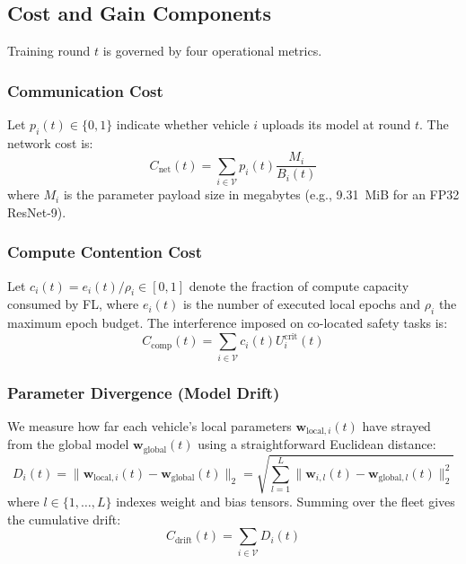 \documentclass[conference]{IEEEtran}
\begin{document}
\subsection{Cost and Gain Components}
Training round $t$ is governed by four operational metrics.

\subsubsection{Communication Cost}
Let $p_i(t) \in \{0,1\}$ indicate whether vehicle $i$ uploads its model at round $t$. The network cost is:
\begin{equation}
C_{\text{net}}(t) = \sum_{i \in \mathcal{V}} p_i(t) \frac{M_i}{B_i(t)}
\end{equation}
where $M_i$ is the parameter payload size in megabytes (e.g., 9.31~MiB for an FP32 ResNet-9).

\subsubsection{Compute Contention Cost}
Let $c_i(t) = e_i(t)/\rho_i \in [0,1]$ denote the fraction of compute capacity consumed by FL, where $e_i(t)$ is the number of executed local epochs and $\rho_i$ the maximum epoch budget. The interference imposed on co-located safety tasks is:
\begin{equation}
C_{\text{comp}}(t) = \sum_{i \in \mathcal{V}} c_i(t) U_i^{\text{crit}}(t)
\end{equation}

\subsubsection{Parameter Divergence (Model Drift)}
We measure how far each vehicle's local parameters $\mathbf{w}_{\text{local},i}(t)$ have strayed from the global model $\mathbf{w}_{\text{global}}(t)$ using a straightforward Euclidean distance:
\begin{equation}
D_i(t) = \| \mathbf{w}_{\text{local}, i}(t) - \mathbf{w}_{\text{global}}(t) \|_2 = \sqrt{\sum_{l=1}^L \| \mathbf{w}_{i, l}(t) - \mathbf{w}_{\text{global}, l}(t) \|_2^2}
\end{equation}
where $l \in \{1, \dots, L\}$ indexes weight and bias tensors. Summing over the fleet gives the cumulative drift:
\begin{equation}
C_{\text{drift}}(t) = \sum_{i \in \mathcal{V}} D_i(t)
\end{equation}
\end{document}
